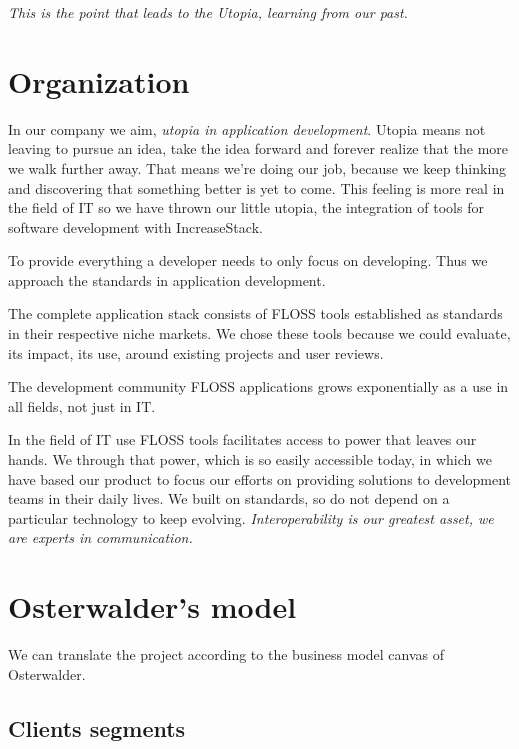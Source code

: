 \documentclass[11pt]{scrartcl}
\begin{document}
\par \emph{This is the point that leads to the Utopia, learning from our past.}

\section{Organization}

\par In our company we aim, \emph{utopia in application development}. Utopia means not leaving to pursue an idea, take the idea forward and forever realize that the more we walk further away. That means we're doing our job, because we keep thinking and discovering that something better is yet to come. This feeling is more real in the field of IT so we have thrown our little utopia, the integration of tools for software development with IncreaseStack.

\par To provide everything a developer needs to only focus on developing. Thus we approach the standards in application development.

\par The complete application stack consists of FLOSS tools established as standards in their respective niche markets. We chose these tools because we could evaluate, its impact, its use, around existing projects and user reviews.

\par The development community FLOSS applications grows exponentially as a use in all fields, not just in IT.

\par In the field of IT use FLOSS tools facilitates access to power that leaves our hands. We through that power, which is so easily accessible today, in which we have based our product to focus our efforts on providing solutions to development teams in their daily lives. We built on standards, so do not depend on a particular technology to keep evolving. \emph{Interoperability is our greatest asset, we are experts in communication.}

\section{Osterwalder's model}

\par We can translate the project according to the business model canvas of Osterwalder.

\subsection{Clients segments}
\end{document}
